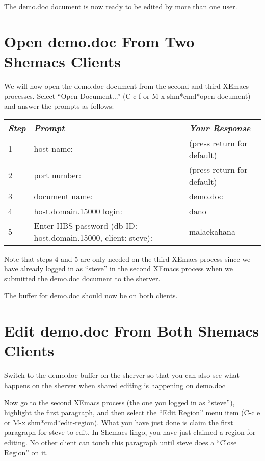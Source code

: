 The demo.doc document is now ready to be edited by more than one user.

\section{Open demo.doc From Two Shemacs Clients}

We will now open the demo.doc document from the second and third XEmacs
processes.  Select ``Open Document...'' (C-c f or M-x
shm*cmd*open-document) and answer the prompts as follows:

\small
\begin{center}
\begin{tabular} {|l|l|l|} \hline
{\em Step} & {\em Prompt}  & {\em Your Response} \\ \hline
1 & host name: & (press return for default) \\
2 & port number: & (press return for default) \\
3 & document name: & demo.doc \\
4 & host.domain.15000 login: & dano \\
5 & Enter HBS password (db-ID: host.domain.15000, client: steve): & malaekahana \\
\hline
\end{tabular}
\end{center}
\normalsize

Note that steps 4 and 5 are only needed on the third XEmacs process since we 
have already logged in as ``steve'' in the second XEmacs process when we 
submitted the demo.doc document to the sherver.

The buffer for demo.doc should now be on both clients.

\section{Edit demo.doc From Both Shemacs Clients}

Switch to the demo.doc buffer on the sherver so that you can also see what 
happens on the sherver when shared editing is happening on demo.doc

Now go to the second XEmacs process (the one you logged in as ``steve''),
highlight the first paragraph, and then select the ``Edit Region'' menu
item (C-c e or M-x shm*cmd*edit-region).  What you have just done is claim
the first paragraph for steve to edit.  In Shemacs lingo, you have just
claimed a region for editing.  No other client can touch this paragraph
until steve does a ``Close Region'' on it.

